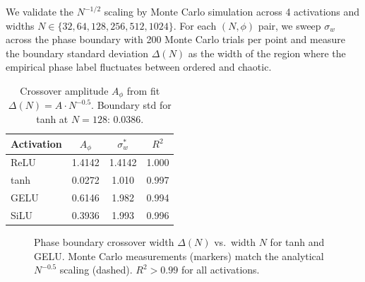 \documentclass[10pt]{article}
\begin{document}
We validate the $N^{-1/2}$ scaling by Monte Carlo simulation across 4 activations and widths $N \in \{32, 64, 128, 256, 512, 1024\}$.
For each $(N, \phi)$ pair, we sweep $\sigma_w$ across the phase boundary with 200 Monte Carlo trials per point and measure the boundary standard deviation $\Delta(N)$ as the width of the region where the empirical phase label fluctuates between ordered and chaotic.

\begin{table}[t]
\centering
\caption{Crossover amplitude $A_\phi$ from fit $\Delta(N) = A \cdot N^{-0.5}$.
Boundary std for tanh at $N\!=\!128$: $0.0386$.}
\label{tab:crossover}
\small
\begin{tabular}{@{}lccc@{}}
\toprule
\textbf{Activation} & $A_\phi$ & $\sigma_w^*$ & $R^2$ \\
\midrule
ReLU  & 1.4142 & 1.4142 & 1.000 \\
tanh  & 0.0272 & 1.010  & 0.997 \\
GELU  & 0.6146 & 1.982  & 0.994 \\
SiLU  & 0.3936 & 1.993  & 0.996 \\
\bottomrule
\end{tabular}
\end{table}

\begin{figure}[t]
\centering
{}
\caption{Phase boundary crossover width $\Delta(N)$ vs.\ width $N$ for tanh and GELU. Monte Carlo measurements (markers) match the analytical $N^{-0.5}$ scaling (dashed). $R^2 > 0.99$ for all activations.}
\label{fig:crossover}
\end{figure}
\end{document}
